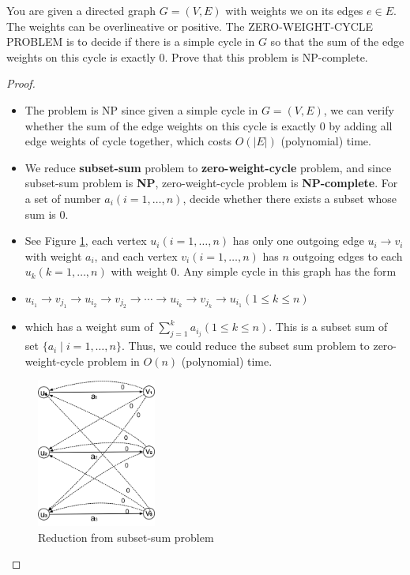 \documentclass{article}
\newcounter{exercise}
\newcommand{\<}{
    \langle}
\renewcommand{\>}{
    \rangle}
\begin{document}
{\begin{exercise}
You are given a directed graph $G=(V,E)$ with weights we on its edges $e\in E$. The weights can be overlineative or positive. The \textsf{ZERO-WEIGHT-CYCLE PROBLEM} is to decide if there is a simple cycle in $G$ so that the sum of the edge weights on this cycle is exactly $0$. Prove that this problem is NP-complete.
\end{exercise}
\begin{proof}
    \leavevmode\newline
    \begin{itemize}
        \item The problem is NP since given a simple cycle in $G=(V,E)$, we can verify whether the sum of the edge weights on this cycle is exactly $0$ by adding all edge weights of cycle together, which costs $O(|E|)$ (polynomial) time.
        \item We reduce \textbf{subset-sum} problem to \textbf{zero-weight-cycle} problem, and since {subset-sum} problem is \textbf{NP}, zero-weight-cycle problem is \textbf{NP-complete}. For a set of number $a_i(i=1,\ldots ,n)$, decide whether there exists a subset whose sum is $0$.
        \item See Figure \ref{fig:ccc}, each vertex $u_i(i=1,\ldots ,n)$ has only one outgoing edge $u_i\rightarrow v_i$ with weight $a_i$, and each vertex $v_i(i=1,\ldots ,n)$ has $n$ outgoing edges to each $u_k(k=1,\ldots,n)$ with weight $0$. Any simple cycle in this graph has the form
        \item $u_{i_1}\rightarrow v_{j_1}\rightarrow u_{i_2}\rightarrow v_{j_2}\rightarrow \cdots \rightarrow u_{i_k}\rightarrow v_{j_k} \rightarrow u_{i_1}(1\leq k\leq n)$
        \item which has a weight sum of $\sum\limits_{j=1}^{k}a_{i_j}(1\leq k\leq n)$. This is a subset sum of set $\{a_i\mid i=1,\ldots ,n\}$. Thus, we could reduce the subset sum problem to zero-weight-cycle problem in $O(n)$ (polynomial) time.
    \end{itemize}

\begin{figure}[!htp]
    \centering
    \includegraphics[width=0.35\textwidth]{img/4.jpg}
    \caption{Reduction from subset-sum problem}
    \label{fig:ccc}
\end{figure}


\end{proof}}
\end{document}
